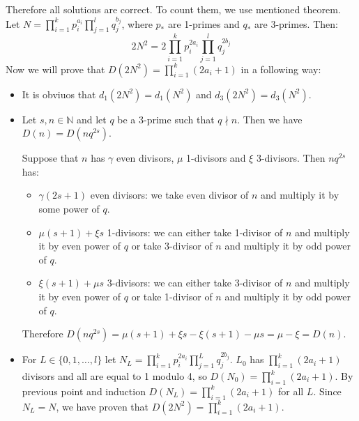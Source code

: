 \documentclass[a4paper,12pt]{article}
\begin{document}
Therefore all solutions are correct. To count them, we use mentioned theorem. Let \(N = \prod_{i = 1}^k p_i^{a_i} \prod_{j = 1}^l q_j^{b_j}\), where \(p_*\) are 1-primes and \(q_*\) are 3-primes. Then: \[2N^2 = 2 \prod_{i = 1}^k p_i^{2a_i} \prod_{j = 1}^l q_j^{2b_j}\]
Now we will prove that \(D(2N^2) = \prod_{i = 1}^k(2a_i + 1)\) in a following way:
\begin{itemize}
\item It is obviuos that \(d_1(2N^2) = d_1(N^2)\) and \(d_3(2N^2) = d_3(N^2)\).
\item  Let \(s, n \in \mathbb{N}\) and let \(q\) be a 3-prime such that \(q \nmid n\). Then we have \(D(n) = D(nq^{2s})\).

Suppose that \(n\) has \(\gamma\) even divisors, \(\mu\) 1-divisors and \(\xi\) 3-divisors. Then \(nq^{2s}\) has:
\begin{itemize}
\item \(\gamma(2s + 1)\) even divisors: we take even divisor of \(n\) and multiply it by some power of \(q\).
\item \(\mu(s + 1) + \xi s\) 1-divisors: we can either take 1-divisor of \(n\) and multiply it by even power of \(q\) or take 3-divisor of \(n\) and multiply it by odd power of \(q\).
\item \(\xi(s + 1) + \mu s\) 3-divisors: we can either take 3-divisor of \(n\) and multiply it by even power of \(q\) or take 1-divisor of \(n\) and multiply it by odd power of \(q\).
\end{itemize}
Therefore \(D(nq^{2s}) = \mu(s + 1) + \xi s - \xi(s + 1) - \mu s = \mu - \xi = D(n)\).

\item For \(L \in \{0, 1, \dots, l\}\) let \(N_L = \prod_{i = 1}^k p_i^{2a_i} \prod_{j = 1}^L q_j^{2b_j}\). \(L_0\) has \(\prod_{i = 1}^k(2a_i + 1)\) divisors and all are equal to 1 modulo 4, so \(D(N_0) = \prod_{i = 1}^k(2a_i + 1)\). By previous point and induction \(D(N_L) = \prod_{i = 1}^k(2a_i + 1)\) for all \(L\). Since \(N_L = N\), we have proven that \(D(2N^2) = \prod_{i = 1}^k(2a_i + 1)\).
\end{itemize}
\end{document}
